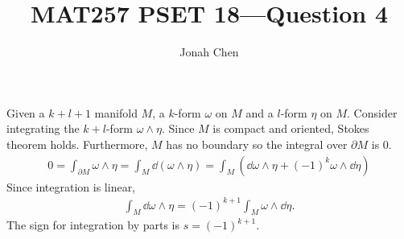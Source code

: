 \documentclass{exam}
\title{MAT257 PSET 18---Question 4}
\author{Jonah Chen}
\date{}
\begin{document}
    \sffamily
    \maketitle
    Given a $k+l+1$ manifold $M$, a $k$-form $\omega$ on $M$ and a $l$-form $\eta$ on $M$. Consider integrating the $k+l$-form $\omega\wedge\eta$. Since $M$ is compact and oriented, Stokes theorem holds. Furthermore, $M$ has no boundary so the integral over $\partial M$ is 0.
    \begin{align*}
    0=\int_{\partial M}\omega\wedge\eta=\int_{M}\dd(\omega\wedge\eta)=\int_M(\dd\omega\wedge\eta+(-1)^k\omega\wedge\dd\eta)
    \end{align*}
    Since integration is linear,
    \begin{align*}
    \int_M\dd\omega\wedge\eta=(-1)^{k+1}\int_M\omega\wedge\dd\eta.
    \end{align*}
    The sign for integration by parts is $s=(-1)^{k+1}$.
\end{document}
